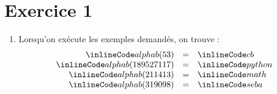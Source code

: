 \section{Exercice 1}
\begin{enumerate}
  \item {}
        Lorsqu'on exécute les exemples demandés, on trouve :
        \[
          \begin{array}{rcl}
            \il{alphab(53)}        & = & \il{cb}     \\
            \il{alphab(189527117)} & = & \il{python} \\
            \il{alphab(211413)}    & = & \il{math}   \\
            \il{alphab(319098)}    & = & \il{seba}   \\
          \end{array}
        \]
\end{enumerate}
